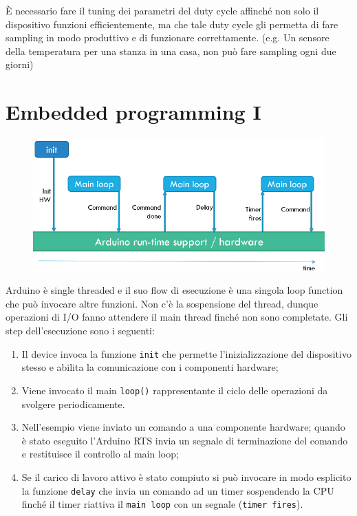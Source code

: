 È necessario fare il tuning dei parametri del duty cycle affinché non solo il dispositivo funzioni efficientemente, ma che tale duty cycle gli permetta di fare sampling in modo produttivo e di funzionare correttamente. (e.g. Un sensore della temperatura per una stanza in una casa, non può fare sampling ogni due giorni)
 
\section{Embedded programming I}

\begin{figure}[htbp]
   \centering
   \includegraphics{images/questions/Schermata del 2023-10-19 15-45-55.png}
   \label{fig:dom14}
\end{figure}

Arduino è single threaded e il suo flow di esecuzione è una singola loop function che può invocare altre funzioni.
Non c'è la sospensione del thread, dunque operazioni di I/O fanno attendere il main thread finché non sono completate.
Gli step dell'esecuzione sono i seguenti:

\begin{enumerate}
\item Il device invoca la funzione \texttt{init} che permette l'inizializzazione del dispositivo stesso e abilita la comunicazione con i componenti hardware;
\item Viene invocato il main \texttt{loop()} rappresentante il ciclo delle operazioni da svolgere periodicamente.
\item Nell'esempio viene inviato un comando a una componente hardware; quando è stato eseguito l'Arduino RTS invia un segnale di terminazione del comando e restituisce il controllo al main loop;
\item Se il carico di lavoro attivo è stato compiuto si può invocare in modo esplicito la funzione \texttt{delay} che invia un comando ad un timer sospendendo la CPU finché il timer riattiva il \texttt{main loop} con un segnale (\texttt{timer fires}).
\end{enumerate}


